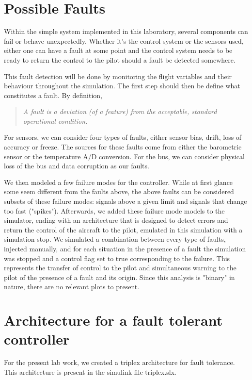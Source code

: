 \documentclass[english,palatino]{ist-report}
\begin{document}
\section{Possible Faults}

Within the simple system implemented in this laboratory, several components can fail or behave unexpectedly. Whether it's the control system or the sensors used, either one can have a fault at some point and the control system needs to be ready to return the control to the pilot should a fault be detected somewhere.

This fault detection will be done by monitoring the flight variables and their behaviour throughout the simulation. The first step should then be define what constitutes a fault. By definition,
\begin{quote} \itshape
	A fault is a deviation (of a feature) from the acceptable, standard operational condition.
\end{quote}
For sensors, we can consider four types of faults, either sensor bias, drift, loss of accuracy or freeze. The sources for these faults come from either the barometric sensor or the temperature A/D conversion. For the bus, we can consider physical loss of the bus and data corruption as our faults.

We then modeled a few failure modes for the controller. While at first glance some seem different from the faults above, the above faults can be considered subsets of these failure modes: signals above a given limit and signals that change too fast ("spikes"). Afterwards, we added these failure mode models to the simulator, ending with an architecture that is designed to detect errors and return the control of the aircraft to the pilot, emulated in this simulation with a simulation stop. We simulated a combination between every type of faults, injected manually, and for each situation in the presence of a fault the simulation was stopped and a control flag set to true corresponding to the failure. This represents the transfer of control to the pilot and simultaneous warning to the pilot of the presence of a fault and its origin. Since this analysis is "binary" in nature, there are no relevant plots to present.

\section{Architecture for a fault tolerant controller}

For the present lab work, we created a triplex architecture for fault tolerance. This architecture is present in the simulink file triplex.slx.
\end{document}
